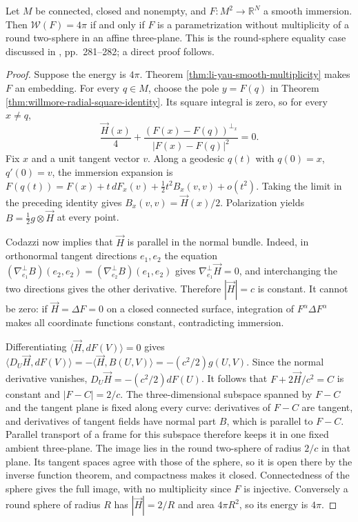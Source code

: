 \begin{theorem}\label{thm:willmore-round-sphere-rigidity}
Let $M$ be connected, closed and nonempty, and $F:M^2\to\mathbb R^N$ a smooth immersion. Then $\mathcal W(F)=4\pi$ if and only if $F$ is a parametrization without multiplicity of a round two-sphere in an affine three-plane. This is the round-sphere equality case discussed in \cite{SimW93}, pp.~281--282; a direct proof follows.
\end{theorem}
\begin{proof}
Suppose the energy is $4\pi$. Theorem \ref{thm:li-yau-smooth-multiplicity} makes $F$ an embedding. For every $q\in M$, choose the pole $y=F(q)$ in Theorem \ref{thm:willmore-radial-square-identity}. Its square integral is zero, so for every $x\ne q$,
\[
 \frac{\vec H(x)}4+\frac{(F(x)-F(q))^{\perp_x}}{|F(x)-F(q)|^2}=0.
\]
Fix $x$ and a unit tangent vector $v$. Along a geodesic $q(t)$ with $q(0)=x$, $q'(0)=v$, the immersion expansion is
$F(q(t))=F(x)+t\,dF_x(v)+\tfrac12t^2B_x(v,v)+o(t^2)$.
Taking the limit in the preceding identity gives $B_x(v,v)=\vec H(x)/2$. Polarization yields $B=\tfrac12g\otimes\vec H$ at every point.

Codazzi now implies that $\vec H$ is parallel in the normal bundle. Indeed, in orthonormal tangent directions $e_1,e_2$ the equation $(\nabla^\perp_{e_1}B)(e_2,e_2)=(\nabla^\perp_{e_2}B)(e_1,e_2)$ gives $\nabla^\perp_{e_1}\vec H=0$, and interchanging the two directions gives the other derivative. Therefore $|\vec H|=c$ is constant. It cannot be zero: if $\vec H=\Delta F=0$ on a closed connected surface, integration of $F^\alpha\Delta F^\alpha$ makes all coordinate functions constant, contradicting immersion.

Differentiating $\langle\vec H,dF(V)\rangle=0$ gives $\langle D_U\vec H,dF(V)\rangle=-\langle\vec H,B(U,V)\rangle=-(c^2/2)g(U,V)$. Since the normal derivative vanishes, $D_U\vec H=-(c^2/2)dF(U)$. It follows that $F+2\vec H/c^2=C$ is constant and $|F-C|=2/c$. The three-dimensional subspace spanned by $F-C$ and the tangent plane is fixed along every curve: derivatives of $F-C$ are tangent, and derivatives of tangent fields have normal part $B$, which is parallel to $F-C$. Parallel transport of a frame for this subspace therefore keeps it in one fixed ambient three-plane. The image lies in the round two-sphere of radius $2/c$ in that plane. Its tangent spaces agree with those of the sphere, so it is open there by the inverse function theorem, and compactness makes it closed. Connectedness of the sphere gives the full image, with no multiplicity since $F$ is injective. Conversely a round sphere of radius $R$ has $|\vec H|=2/R$ and area $4\pi R^2$, so its energy is $4\pi$.
\end{proof}

